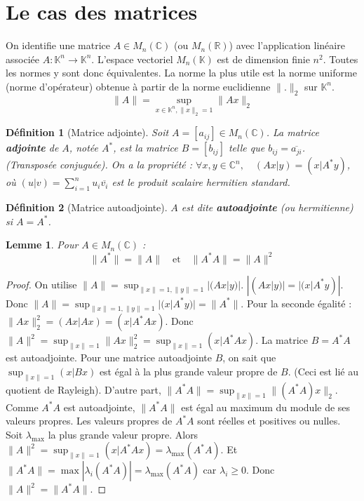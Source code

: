 \documentclass{article}
\newtheorem{lemma}{Lemme} %
\newtheorem{definition}{Définition} %
\theoremstyle{definition} %
\begin{document}
\section{Le cas des matrices}

On identifie une matrice $A \in M_n(\mathbb{C})$ (ou $M_n(\mathbb{R})$) avec l'application linéaire associée $A: \mathbb{K}^n \to \mathbb{K}^n$.
L'espace vectoriel $M_n(\mathbb{K})$ est de dimension finie $n^2$. Toutes les normes y sont donc équivalentes.
La norme la plus utile est la norme uniforme (norme d'opérateur) obtenue à partir de la norme euclidienne $\|.\|_2$ sur $\mathbb{K}^n$.
\[ \|A\| = \sup_{x \in \mathbb{K}^n, \|x\|_2 = 1} \|Ax\|_2 \]

\begin{definition}[Matrice adjointe]
Soit $A = [a_{ij}] \in M_n(\mathbb{C})$. La matrice \textbf{adjointe} de $A$, notée $A^*$, est la matrice $B = [b_{ij}]$ telle que $b_{ij} = \overline{a_{ji}}$. (Transposée conjuguée).
On a la propriété : $\forall x, y \in \mathbb{C}^n, \quad (Ax | y) = (x | A^*y)$, où $(u|v) = \sum_{i=1}^n u_i \overline{v_i}$ est le produit scalaire hermitien standard.
\end{definition}

\begin{definition}[Matrice autoadjointe]
$A$ est dite \textbf{autoadjointe} (ou hermitienne) si $A = A^*$.
\end{definition}

\begin{lemma}
Pour $A \in M_n(\mathbb{C})$ :
\[ \|A^*\| = \|A\| \quad \text{et} \quad \|A^*A\| = \|A\|^2 \]
\end{lemma}
\begin{proof}
On utilise $\|A\| = \sup_{\|x\|=1, \|y\|=1} |(Ax|y)|$.
$|(Ax|y)| = |(x|A^*y)|$. Donc $\|A\| = \sup_{\|x\|=1, \|y\|=1} |(x|A^*y)| = \|A^*\|$.
Pour la seconde égalité :
$\|Ax\|_2^2 = (Ax|Ax) = (x|A^*Ax)$.
Donc $\|A\|^2 = \sup_{\|x\|=1} \|Ax\|_2^2 = \sup_{\|x\|=1} (x|A^*Ax)$.
La matrice $B = A^*A$ est autoadjointe. Pour une matrice autoadjointe $B$, on sait que $\sup_{\|x\|=1} (x|Bx)$ est égal à la plus grande valeur propre de $B$. (Ceci est lié au quotient de Rayleigh).
D'autre part, $\|A^*A\| = \sup_{\|x\|=1} \|(A^*A)x\|_2$.
Comme $A^*A$ est autoadjointe, $\|A^*A\|$ est égal au maximum du module de ses valeurs propres.
Les valeurs propres de $A^*A$ sont réelles et positives ou nulles. Soit $\lambda_{\max}$ la plus grande valeur propre.
Alors $\|A\|^2 = \sup_{\|x\|=1} (x|A^*Ax) = \lambda_{\max}(A^*A)$.
Et $\|A^*A\| = \max |\lambda_i(A^*A)| = \lambda_{\max}(A^*A)$ car $\lambda_i \ge 0$.
Donc $\|A\|^2 = \|A^*A\|$.
\end{proof}
\end{document}
